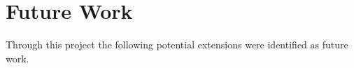 






\section{Future Work}

Through this project the following potential extensions were identified as future work.

